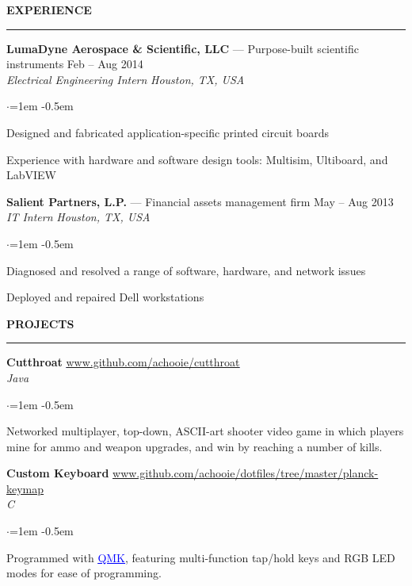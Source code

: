 \documentclass[10pt, a4paper]{article}
\newenvironment{aSection}[1]{
    \medskip \textbf{\uppercase{#1}}
    \smallskip
    \hrule
    \begin{list}{}{
            \setlength{\leftmargin}{1.5em}
        }
    \item[]
    }{
    \end{list}
}
\newenvironment{aSubsection}[4]{
    {#1} \hfill {#2} \\
    \textit{#3} \hfill \textit{#4}
    \smallskip
    \begin{list}{$\cdot$}{\leftmargin=1em}
    \itemsep -0.5em \vspace{-0.5em}
    }{
    \end{list}
    \vspace{0.5em}
}
\begin{document}
\begin{aSection}{Experience}
    \begin{aSubsection}
        {\textbf{LumaDyne Aerospace \& Scientific, LLC} --- Purpose-built scientific
        instruments}
        {Feb -- Aug 2014}
        {Electrical Engineering Intern}
        {Houston, TX, USA}
    \item Designed and fabricated application-specific printed circuit boards
    \item Experience with hardware and software design tools: Multisim, Ultiboard, and LabVIEW
    \end{aSubsection}

    \begin{aSubsection}
        {\textbf{Salient Partners, L.P.} --- Financial assets management firm}
        {May -- Aug 2013}
        {IT Intern}
        {Houston, TX, USA}
    \item Diagnosed and resolved a range of software, hardware, and network issues
    \item Deployed and repaired Dell workstations
    \end{aSubsection}
\end{aSection}

\begin{aSection}{Projects}
    \begin{aSubsection}
        {\textbf{Cutthroat}}
        {\textcolor{blue}{\underline{\url{www.github.com/achooie/cutthroat}}}}
        {Java}{}
    \item[] Networked multiplayer, top-down, ASCII-art shooter video game in which players mine for
        ammo and weapon upgrades, and win by reaching a number of kills.
    \end{aSubsection}

    \begin{aSubsection}
        {\textbf{Custom Keyboard}}
        {\textcolor{blue}{\underline{
            \url{www.github.com/achooie/dotfiles/tree/master/planck-keymap}
        }}}
        {C}{}
    \item[] Programmed with
        \href{www.github.com/achooie/qmk_firmware}{\textcolor{blue}{\underline{QMK}}}, featuring
        multi-function tap/hold keys and RGB LED modes for ease of programming.
    \end{aSubsection}
\end{aSection}
\end{document}
